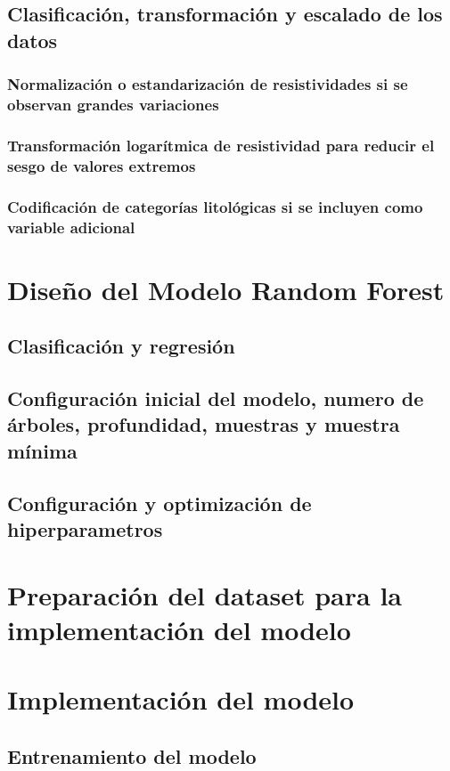 	\subsection{Clasificación, transformación y escalado de los datos}
		\subsubsection{Normalización o estandarización de resistividades si se observan grandes variaciones}
		\subsubsection{Transformación logarítmica de resistividad para reducir el sesgo de valores extremos}
		\subsubsection{Codificación de categorías litológicas si se incluyen como variable adicional}

\section{Diseño del Modelo Random Forest}
	\subsection{Clasificación y regresión}
	\subsection{Configuración inicial del modelo, numero de árboles, profundidad, muestras y muestra mínima}
	\subsection{Configuración y optimización de hiperparametros}

\section{Preparación del dataset para la implementación del modelo}

\section{Implementación del modelo}
\subsection{Entrenamiento del modelo}
